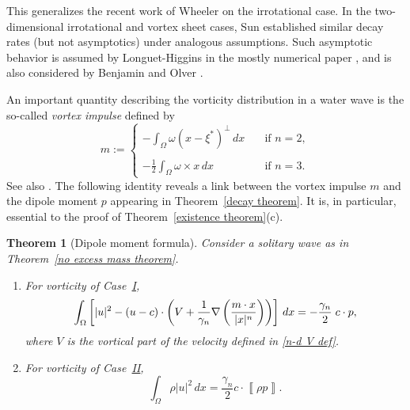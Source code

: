 \documentclass[11pt,reqno]{amsart}
\newcommand{\I}{\texorpdfstring{\hyperref[sec non-singular]{I}}{I}}
\newcommand{\VS}{\texorpdfstring{\hyperref[sec sheets]{II}}{II}}
\newcommand{\jump}[1]{\left\llbracket{#1}\right\rrbracket}
\theoremstyle{plain}
\newtheorem{theorem}{Theorem}[section]
\theoremstyle{remark}
\numberwithin{equation}{section}
\begin{document}
This generalizes the recent work of Wheeler \cite{wheeler2016integral} on the irrotational case. In the two-dimensional irrotational and vortex sheet cases, Sun \cite{sun1997analytical} established similar decay rates (but not asymptotics) under analogous assumptions. Such asymptotic behavior is assumed by Longuet-Higgins in the mostly numerical paper \cite{longuet1989capillary}, and is also considered by Benjamin and Olver \cite[Section~6.5]{benjamin1982hamiltonian}.

An important quantity describing the vorticity distribution in a water wave is the so-called \emph{vortex impulse} defined by 
\begin{equation}
\label{vortex impulse}
  m := \left\{\begin{array}{ll} 
    - \displaystyle \int_\Omega \omega (x - \xi^*)^{\perp} \, dx \quad & \text{if } n = 2, \\ \\
    - \displaystyle \frac 12 \int_\Omega \omega \times x \, dx  & \text{if } n = 3.
  \end{array}\right.
\end{equation}
See also \cite[Chapter 3.2, 3.7]{saffman1992book}. The following identity reveals a link between the vortex impulse $m$ and the dipole moment $p$ appearing in Theorem~\ref{decay theorem}. It is, in particular, essential to the proof of Theorem~\ref{existence theorem}(c).
\begin{theorem}[Dipole moment formula] \label{integral identity theorem} 
  Consider a solitary wave as in Theorem~\ref{no excess mass theorem}.
  \begin{enumerate}[label=\rm(\alph*)]
  \item  For vorticity of Case~\I,
    \begin{equation}
      \int_{\Omega} \left[  |u|^2 - (u-c) \cdot \left( V +  {1 \over \gamma_n} \nabla\left( {m \cdot x \over |x|^n} \right) \right) \right] \, dx = -\frac{\gamma_n}{2} \; c \cdot  p, \label{dipole formula} 
    \end{equation}
    where $V$ is the vortical part of the velocity defined in \eqref{n-d V def}.

\item  For vorticity of Case~\VS,
  \begin{equation}
    \int_\Omega \rho |u|^2  \, dx =  \frac{\gamma_n}{2}    c \cdot \jump{\rho p}. \label{vortex sheet dipole formula} 
  \end{equation}
  \end{enumerate}
\end{theorem}
\end{document}
